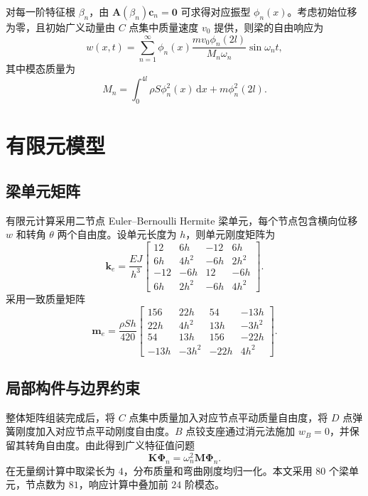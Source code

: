 \documentclass[UTF8,a4paper,zihao=-4]{ctexart}
\begin{document}
对每一阶特征根 $\beta_n$，由 $\bm A(\beta_n)\bm c_n=\bm 0$ 可求得对应振型 $\phi_n(x)$。考虑初始位移为零，且初始广义动量由 $C$ 点集中质量速度 $v_0$ 提供，则梁的自由响应为
\begin{equation}
w(x,t)=
\sum_{n=1}^{\infty}
\phi_n(x)
\frac{m v_0\phi_n(2l)}
{M_n\omega_n}
\sin\omega_n t ,
\label{eq:response}
\end{equation}
其中模态质量为
\begin{equation}
M_n=
\int_0^{4l}\rho S\phi_n^2(x)\,\mathrm dx+
m\phi_n^2(2l).
\end{equation}

\section{有限元模型}

\subsection{梁单元矩阵}

有限元计算采用二节点 Euler--Bernoulli Hermite 梁单元，每个节点包含横向位移 $w$ 和转角 $\theta$ 两个自由度。设单元长度为 $h$，则单元刚度矩阵为
\begin{equation}
\bm k_e=\frac{EJ}{h^3}
\begin{bmatrix}
12&6h&-12&6h\\
6h&4h^2&-6h&2h^2\\
-12&-6h&12&-6h\\
6h&2h^2&-6h&4h^2
\end{bmatrix}.
\end{equation}
采用一致质量矩阵
\begin{equation}
\bm m_e=\frac{\rho S h}{420}
\begin{bmatrix}
156&22h&54&-13h\\
22h&4h^2&13h&-3h^2\\
54&13h&156&-22h\\
-13h&-3h^2&-22h&4h^2
\end{bmatrix}.
\end{equation}

\subsection{局部构件与边界约束}

整体矩阵组装完成后，将 $C$ 点集中质量加入对应节点平动质量自由度，将 $D$ 点弹簧刚度加入对应节点平动刚度自由度。$B$ 点铰支座通过消元法施加 $w_B=0$，并保留其转角自由度。由此得到广义特征值问题
\begin{equation}
\bm K\bm \Phi_n=\omega_n^2\bm M\bm \Phi_n .
\label{eq:fem_eigen}
\end{equation}
在无量纲计算中取梁长为 $4$，分布质量和弯曲刚度均归一化。本文采用 $80$ 个梁单元，节点数为 $81$，响应计算中叠加前 $24$ 阶模态。
\end{document}
